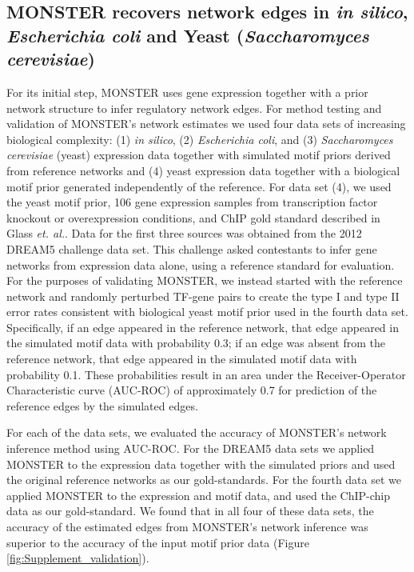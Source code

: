 \subsection*{MONSTER recovers network edges in \emph{in silico}, \emph{Escherichia coli} and Yeast (\emph{Saccharomyces cerevisiae})}

For its initial step, MONSTER uses gene expression together with a prior network structure to infer regulatory network edges. For method testing and validation of MONSTER's network estimates we used four data sets of increasing biological complexity: (1) \emph{in silico}, (2) \emph{Escherichia coli}, and (3) \emph{Saccharomyces cerevisiae} (yeast) expression data together with simulated motif priors derived from reference networks and (4) yeast expression data together with a biological motif prior generated independently of the reference. For data set (4), we used the yeast motif prior, 106 gene expression samples from transcription factor knockout or overexpression conditions, and ChIP gold standard described in Glass \emph{et. al.}\cite{glass2013passing}. Data for the first three sources was obtained from the 2012 DREAM5 challenge data set\cite{marbach2012wisdom}. This challenge asked contestants to infer gene networks from expression data alone, using a reference standard for evaluation. For the purposes of  validating MONSTER, we instead started with the reference network and randomly perturbed TF-gene pairs to create the type I and type II error rates consistent with biological yeast motif prior used in the fourth data set.  Specifically, if an edge appeared in the reference network, that edge appeared in the simulated motif data with probability 0.3;  if an edge was absent from the reference network, that edge appeared in the simulated motif data with probability 0.1.  These probabilities result in an area under the Receiver-Operator Characteristic curve (AUC-ROC) of approximately 0.7 for prediction of the reference edges by the simulated edges.  

For each of the data sets, we evaluated the accuracy of MONSTER's network inference method using AUC-ROC. For the DREAM5 data sets we applied MONSTER to the expression data together with the simulated priors and used the original reference networks as our gold-standards. For the fourth data set we applied MONSTER to the expression and motif data, and used the ChIP-chip data as our gold-standard.  We found that in all four of these data sets, the accuracy of the estimated edges from MONSTER's network inference was superior to the accuracy of the input motif prior data (Figure \ref{fig:Supplement_validation}).

